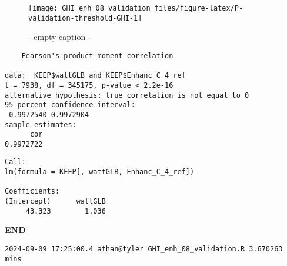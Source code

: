 \documentclass[
  10pt,
  a4paper,oneside]{article}
\begin{document}
\newpage

\begin{figure}[H]

{\centering \texttt{[image: GHI\_enh\_08\_validation\_files/figure-latex/P-validation-threshold-GHI-1]} 

}

\caption{ - empty caption - }\label{fig:P-validation-threshold-GHI}
\end{figure}

\begin{verbatim}
    Pearson's product-moment correlation

data:  KEEP$wattGLB and KEEP$Enhanc_C_4_ref
t = 7938, df = 345175, p-value < 2.2e-16
alternative hypothesis: true correlation is not equal to 0
95 percent confidence interval:
 0.9972540 0.9972904
sample estimates:
      cor 
0.9972722 
\end{verbatim}

\begin{verbatim}
Call:
lm(formula = KEEP[, wattGLB, Enhanc_C_4_ref])

Coefficients:
(Intercept)      wattGLB  
     43.323        1.036  
\end{verbatim}

\textbf{END}

\begin{verbatim}
2024-09-09 17:25:00.4 athan@tyler GHI_enh_08_validation.R 3.670263 mins
\end{verbatim}
\end{document}
